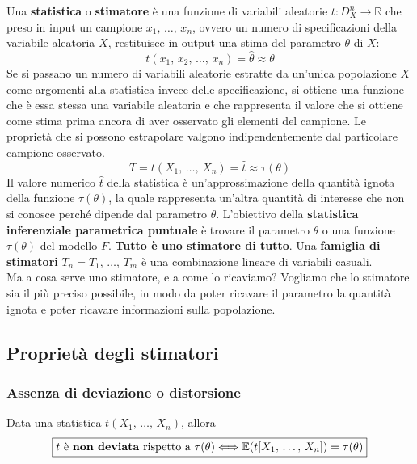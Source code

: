 \newline \newline
\noindent Una \textbf{statistica} o \textbf{stimatore} è una funzione di variabili aleatorie $t : D_X^n \rightarrow \mathbb R$ che preso in input un campione $x_1, \, \dots, \, x_n$, ovvero un numero di specificazioni della variabile aleatoria $X$, restituisce in output una stima del parametro $\theta$ di $X$: \[
\boxed{
t(x_1, \, x_2, \, \dots, \, x_n) = \hat \theta \approx \theta 
}
\]
Se si passano un numero di variabili aleatorie estratte da un'unica popolazione $X$ come argomenti alla statistica invece delle specificazione, si ottiene una funzione che è essa stessa una variabile aleatoria e che rappresenta il valore che si ottiene come stima prima ancora di aver osservato gli elementi del campione. Le proprietà che si possono estrapolare valgono indipendentemente dal particolare campione osservato.
\[
\boxed{
T = t(X_1, \, \dots , \, X_n) = \hat{t} \approx \tau(\theta)}
\]
Il valore numerico $\hat{t}$ della statistica è un'approssimazione della quantità ignota della funzione $\tau(\theta)$, la quale rappresenta un'altra quantità di interesse che non si conosce perché dipende dal parametro $\theta$.
\newline \newline
L'obiettivo della {\textbf{statistica inferenziale parametrica puntuale}} è trovare il parametro $\theta$ o una funzione $\tau(\theta)$ del modello $F$. \textbf{Tutto è uno stimatore di tutto}.
\newline
Una \textbf{famiglia di stimatori} $T_n = T_1, \, \dots, \, T_m$ è una combinazione lineare di variabili casuali.
\\
Ma a cosa serve uno stimatore, e a come lo ricaviamo?
Vogliamo che lo stimatore sia il più preciso possibile, in modo da poter ricavare il parametro la quantità ignota e poter ricavare informazioni sulla popolazione.

\subsection{Proprietà degli stimatori}

\subsubsection{Assenza di deviazione o distorsione}
Data una statistica $t(X_1, \, \dots, \, X_n)$, allora \[
\boxed{
t \text{ è \textbf{non deviata} rispetto a } \tau(\theta) \Longleftrightarrow \mathbb{E}(t[X_1, \, \dots, \, X_n]) = \tau(\theta)
}
\]

